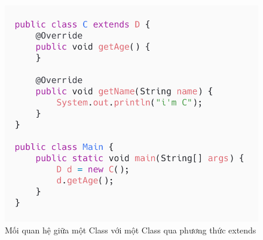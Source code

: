 \documentclass[12pt]{report}
\begin{document}
\begin{figure}[!htbp]
	\centering
	\includegraphics[scale=0.5]{images/CextendD}
	\caption{Mối quan hệ giữa một Class với một Class qua phương thức extends}
	\label{fig:CextendD}
\end{figure}
\end{document}
